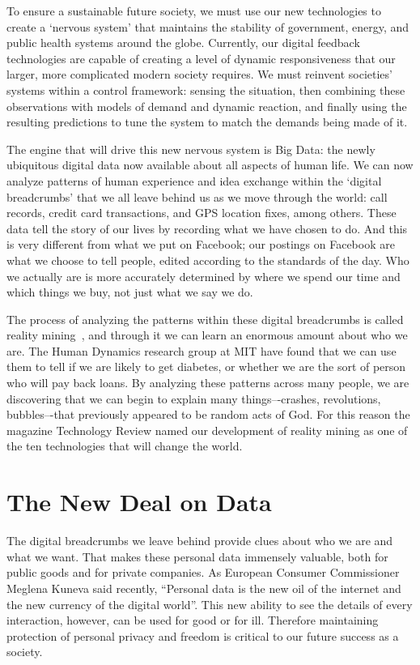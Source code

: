 To ensure a sustainable future society, we must use our new technologies to create a `nervous system’ that maintains the stability of government, energy, and public health systems around the globe.
Currently, our digital feedback technologies are capable of creating a level of dynamic responsiveness that our larger, more complicated modern society requires.
We must reinvent societies’ systems within a control framework: sensing the situation, then combining these observations with models of demand and dynamic reaction, and finally using the resulting predictions to tune the system to match the demands being made of it.

The engine that will drive this new nervous system is Big Data: the newly ubiquitous digital data now available about all aspects of human life.
We can now analyze patterns of human experience and idea exchange within the `digital breadcrumbs’ that we all leave behind us as we move through the world: call records, credit card transactions, and GPS location fixes, among others.
These data tell the story of our lives by recording what we have chosen to do.
And this is very different from what we put on Facebook; our postings on Facebook are what we choose to tell people, edited according to the standards of the day.
Who we actually are is more accurately determined by where we spend our time and which things we buy, not just what we say we do.

The process of analyzing the patterns within these digital breadcrumbs is called reality mining~\cite{eagle2006reality,pentland2009reality}, and through it we can learn an enormous amount about who we are.
The Human Dynamics research group at MIT have found that we can use them to tell if we are likely to get diabetes, or whether we are the sort of person who will pay back loans.
By analyzing these patterns across many people, we are discovering that we can begin to explain many things–-crashes, revolutions, bubbles–-that previously appeared to be random acts of God.
For this reason the magazine Technology Review named our development of reality mining as one of the ten technologies that will change the world\cite{greene2008reality}. 

\section{The New Deal on Data}

The digital breadcrumbs we leave behind provide clues about who we are and what we want.
That makes these personal data immensely valuable, both for public goods and for private companies.
As European Consumer Commissioner Meglena Kuneva said recently, “Personal data is the new oil of the internet and the new currency of the digital world”.
This new ability to see the details of every interaction, however, can be used for good or for ill.
Therefore maintaining protection of personal privacy and freedom is critical to our future success as a society.

